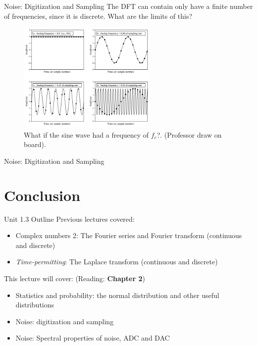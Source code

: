 \documentclass{beamer}
\begin{document}
\begin{frame}{Noise: Digitization and Sampling}
The DFT can contain only have a finite number of frequencies, since it is discrete.  What are the limits of this?
\begin{figure}
\centering
\includegraphics[width=0.6\textwidth]{figures/sampling.png}
\caption{\label{fig:sampling2} What if the sine wave had a frequency of $f_{c}$?. (Professor draw on board).}
\end{figure}
\end{frame}

\begin{frame}{Noise: Digitization and Sampling}

\end{frame}

\section{Conclusion}

\begin{frame}{Unit 1.3 Outline}
Previous lectures covered:
\begin{itemize}
\item Complex numbers 2: The Fourier series and Fourier transform (continuous and discrete)
\item \textit{Time-permitting}: The Laplace transform (continuous and discrete)
\end{itemize}
This lecture will cover: (Reading: \textbf{Chapter 2})
\begin{itemize}
\item \alert{Statistics and probability: the normal distribution and other useful distributions}
\item \alert{Noise: digitization and sampling}
\item Noise: Spectral properties of noise, ADC and DAC
\end{itemize}
\end{frame}
\end{document}
